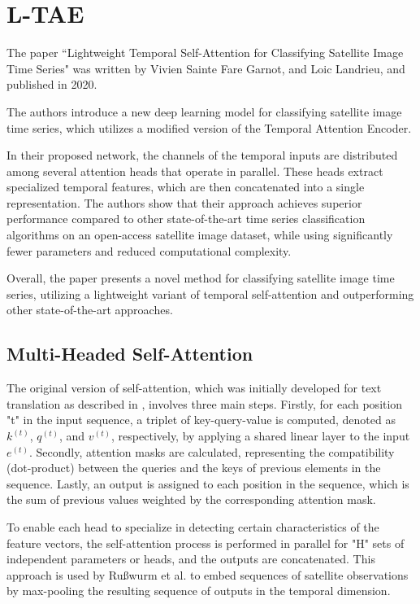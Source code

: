 \section{L-TAE}
The paper ``Lightweight Temporal Self-Attention for Classifying Satellite Image Time Series" \cite{LTAE} was written by Vivien Sainte Fare Garnot, and Loic Landrieu, and published in 2020.

The authors introduce a new deep learning model for classifying satellite image time series, which utilizes a modified version of the Temporal Attention Encoder.

In their proposed network, the channels of the temporal inputs are distributed among several attention heads that operate in parallel. These heads extract specialized temporal features, which are then concatenated into a single representation. The authors show that their approach achieves superior performance compared to other state-of-the-art time series classification algorithms on an open-access satellite image dataset, while using significantly fewer parameters and reduced computational complexity.

Overall, the paper presents a novel method for classifying satellite image time series, utilizing a lightweight variant of temporal self-attention and outperforming other state-of-the-art approaches.

\subsection{Multi-Headed Self-Attention}

The original version of self-attention, which was initially developed for text translation as described in \cite{vaswani}, involves three main steps.
Firstly, for each position "t" in the input sequence, a triplet of key-query-value is computed, denoted as $k^{(t)}$, $q^{(t)}$, and $v^{(t)}$, respectively, by applying a shared linear layer to the input $e^{(t)}$.
Secondly, attention masks are calculated, representing the compatibility (dot-product) between the queries and the keys of previous elements in the sequence. 
Lastly, an output is assigned to each position in the sequence, which is the sum of previous values weighted by the corresponding attention mask.

To enable each head to specialize in detecting certain characteristics of the feature vectors, the self-attention process is performed in parallel for "H" sets of independent parameters or heads, and the outputs are concatenated.
This approach is used by Rußwurm et al. \cite{russwurm2019self} to embed sequences of satellite observations by max-pooling the resulting sequence of outputs in the temporal dimension.

